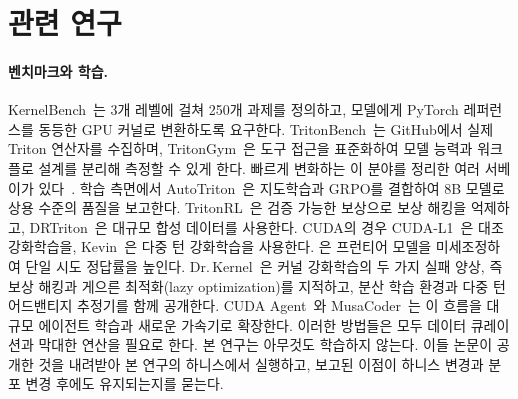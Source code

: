 \documentclass[11pt]{article}
\begin{document}
\section{관련 연구}\label{sec:related}

\paragraph{벤치마크와 학습.}
KernelBench~\citep{ouyang2024kernelbench}는 3개 레벨에 걸쳐 250개 과제를 정의하고, 모델에게
PyTorch 레퍼런스를 동등한 GPU 커널로 변환하도록 요구한다. TritonBench~\citep{li2025tritonbench}는
GitHub에서 실제 Triton 연산자를 수집하며, TritonGym~\citep{tritongym2026}은 도구 접근을 표준화하여
모델 능력과 워크플로 설계를 분리해 측정할 수 있게 한다.
빠르게 변화하는 이 분야를 정리한 여러 서베이가
있다~\citep{yu2026automated_kernel_survey, zhang2026compilerstack, gong2025codeopt_survey}.
학습 측면에서 AutoTriton~\citep{li2025autotriton}은 지도학습과 GRPO를 결합하여 8B 모델로 상용 수준의
품질을 보고한다. TritonRL~\citep{woo2025tritonrl}은 검증 가능한 보상으로 보상 해킹을 억제하고,
DRTriton~\citep{drtriton2025}은 대규모 합성 데이터를 사용한다.
CUDA의 경우 CUDA-L1~\citep{cudal1_2026}은 대조 강화학습을, Kevin~\citep{baronio2025kevin}은 다중 턴
강화학습을 사용한다. \citet{tehrani2026gpt5kernel}은 프런티어 모델을 미세조정하여 단일 시도 정답률을 높인다.
Dr.\,Kernel~\citep{drkernel2026}은 커널 강화학습의 두 가지 실패 양상, 즉 보상 해킹과 게으른
최적화(lazy optimization)를 지적하고, 분산 학습 환경과 다중 턴 어드밴티지 추정기를 함께 공개한다.
CUDA Agent~\citep{dai2026cudaagent}와 MusaCoder~\citep{cheng2026musacoder}는 이 흐름을 대규모 에이전트
학습과 새로운 가속기로 확장한다. 이러한 방법들은 모두 데이터 큐레이션과 막대한 연산을 필요로 한다.
본 연구는 아무것도 학습하지 않는다. 이들 논문이 공개한 것을 내려받아 본 연구의 하니스에서 실행하고,
보고된 이점이 하니스 변경과 분포 변경 후에도 유지되는지를 묻는다.
\end{document}
